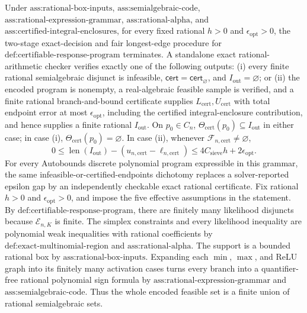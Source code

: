 Under \(\text{ass:rational-box-inputs}\), \(\text{ass:semialgebraic-code}\), \(\text{ass:rational-expression-grammar}\), \(\text{ass:rational-alpha}\), and \(\text{ass:certified-integral-enclosures}\), for every fixed rational \(h>0\) and \(\epsilon_{\mathrm{opt}}>0\), the two-stage exact-decision and fair longest-edge procedure for \(\text{def:certifiable-response-program}\) terminates.  A standalone exact rational-arithmetic checker verifies exactly one of the following outputs: (i) every finite rational semialgebraic disjunct is infeasible, \(\mathsf{cert}=\mathsf{cert}_{\varnothing}\), and \(I_{\mathrm{out}}=\varnothing\); or (ii) the encoded program is nonempty, a real-algebraic feasible sample is verified, and a finite rational branch-and-bound certificate supplies \(L_{\mathrm{cert}},U_{\mathrm{cert}}\) with total endpoint error at most \(\epsilon_{\mathrm{opt}}\), including the certified integral-enclosure contribution, and hence supplies a finite rational \(I_{\mathrm{out}}\).  On \(p_0\in C_n\), \(\Theta_{\mathrm{cert}}(p_0)\subseteq I_{\mathrm{out}}\) in either case; in case (i), \(\Theta_{\mathrm{cert}}(p_0)=\varnothing\).  In case (ii), whenever \(\mathcal F_{n,\mathrm{cert}}\ne\varnothing\),
\[
0\leq\operatorname{len}(I_{\mathrm{out}})-(u_{n,\mathrm{cert}}-\ell_{n,\mathrm{cert}})
\leq4C_{\mathrm{sieve}}h+2\epsilon_{\mathrm{opt}}.
\]
For every Autobounds discrete polynomial program expressible in this grammar, the same infeasible-or-certified-endpoints dichotomy replaces a solver-reported epsilon gap by an independently checkable exact rational certificate.
Fix rational \(h>0\) and \(\epsilon_{\mathrm{opt}}>0\), and impose the five effective assumptions in the statement.  By \(\text{def:certifiable-response-program}\), there are finitely many likelihood disjuncts because \(\mathcal E_{n,K}\) is finite.  The simplex constraints and every likelihood inequality are polynomial weak inequalities with rational coefficients by \(\text{def:exact-multinomial-region}\) and \(\text{ass:rational-alpha}\).  The support is a bounded rational box by \(\text{ass:rational-box-inputs}\).  Expanding each \(\min\), \(\max\), and ReLU graph into its finitely many activation cases turns every branch into a quantifier-free rational polynomial sign formula by \(\text{ass:rational-expression-grammar}\) and \(\text{ass:semialgebraic-code}\).  Thus the whole encoded feasible set is a finite union of rational semialgebraic sets.

